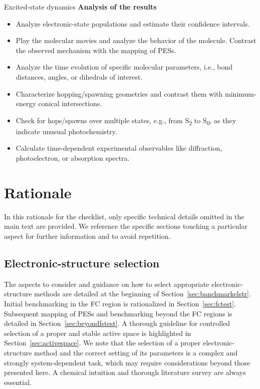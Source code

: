 \documentclass[9pt,bestpractices,pubversion]{livecoms}
\begin{document}
\begin{Checklists*}[p!]
\begin{checklist}{Excited-state dynamics}
\textbf{Analysis of the results}

\begin{itemize}
    \item Analyze electronic-state populations and estimate their confidence intervals.
    \item Play the molecular movies and analyze the behavior of the molecule. Contrast the observed mechanism with the mapping of PESs.
    \item Analyze the time evolution of specific molecular parameters, i.e., bond distances, angles, or dihedrals of interest.
    \item Characterize hopping/spawning geometries and contrast them with minimum-energy conical intersections.
    \item Check for hops/spawns over multiple states, e.g., from S\textsubscript{2} to S\textsubscript{0}, as they indicate unusual photochemistry.
    \item Calculate time-dependent experimental observables like diffraction, photoelectron, or absorption spectra.
\end{itemize}
\end{checklist}
\end{Checklists*}
\clearpage

\section{Rationale}
\label{sec:rationale}
In this rationale for the checklist, only specific technical details omitted in the main text are provided. We reference the specific sections touching a particular aspect for further information and to avoid repetition.

\subsection{Electronic-structure selection}

The aspects to consider and guidance on how to select appropriate electronic-structure methods are detailed at the beginning of Section~\ref{sec:banchmarkelstr}. Initial benchmarking in the FC region is rationalized in Section~\ref{sec:fctest}. Subsequent mapping of PESs and benchmarking beyond the FC regions is detailed in Section~\ref{sec:beyondfstest}. A thorough guideline for controlled selection of a proper and stable active space is highlighted in Section~\ref{sec:activespace}. We note that the selection of a proper electronic-structure method and the correct setting of its parameters is a complex and strongly system-dependent task, which may require considerations beyond those presented here. A chemical intuition and thorough literature survey are always essential.
\end{document}
